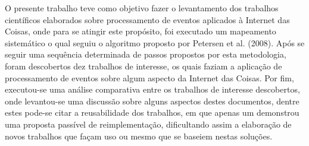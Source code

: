\documentclass[ti,table]{texufpel} %
\begin{document}
\label{cap:Consideracoes_Finais} 

  

O presente trabalho teve como objetivo fazer o levantamento dos trabalhos científicos elaborados sobre processamento de eventos aplicados à Internet das Coisas, onde para se atingir este propósito, foi executado um mapeamento sistemático o qual seguiu o algoritmo proposto por Petersen et al. (2008). Após se seguir uma sequência determinada de passos propostos por esta metodologia, foram descobertos dez trabalhos de interesse, os quais faziam a aplicação de processamento de eventos sobre algum aspecto da Internet das Coisas. Por fim, executou-se uma análise comparativa entre os trabalhos de interesse descobertos, onde levantou-se uma discussão sobre alguns aspectos destes documentos, dentre estes pode-se citar a reusabilidade dos trabalhos, em que apenas um demonstrou uma proposta passível de reimplementação, dificultando assim a elaboração de novos trabalhos que façam uso ou mesmo que se baseiem nestas soluções. 

  


  


  


 

 

  
\end{document}
